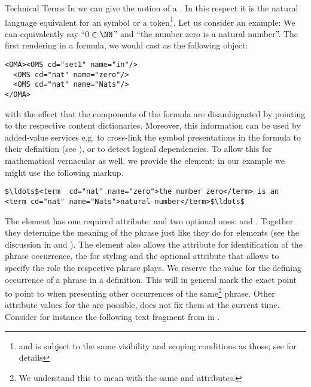 \begin{module}[id=mtext]
\begin{omgroup}[id=mtext,short=Mathematical Text]
\begin{omgroup}[id=terms]{Technical Terms}
  In {\omdoc} we can give the notion of a . In this respect it is the natural language equivalent for an
  {\openmath} symbol or a {\cmathml} token\footnote{and is subject to the same visibility
    and scoping conditions as those; see {} for details}. Let us
  consider an example: We can equivalently say ``$0\in\NN$'' and ``the number zero is a
  natural number''. The first rendering in a formula, we would cast as the following
  {\openmath} object:
\begin{lstlisting}[language=OpenMath,numbers=none]
<OMA><OMS cd="set1" name="in"/>
  <OMS cd="nat" name="zero"/>
  <OMS cd="nat" name="Nats"/>
</OMA>
\end{lstlisting}
with the effect that the components of the formula are disambiguated by pointing to the
respective content dictionaries. Moreover, this information can be used by added-value
services e.g. to cross-link the symbol presentations in the formula to their definition
(see {}), or to detect logical dependencies. To allow
this for mathematical vernacular as well, we provide the {} element: in our
example we might use the following markup.
\begin{lstlisting}[language=OpenMath,numbers=none,mathescape]
$\ldots$<term  cd="nat" name="zero">the number zero</term> is an 
<term cd="nat" name="Nats">natural number</term>$\ldots$
\end{lstlisting}
\begin{definition}[id=term.def]
  The {} element has one required attribute: {} and two
  optional ones: {} and {}.  Together they
  determine the meaning of the phrase just like they do for {}
  elements (see the discussion in {} and {}). The
  {} element also allows the attribute {}
  for identification of the phrase occurrence, the {\css}
   for styling and the optional
  {} attribute that allows to specify the role the respective phrase
  plays. We reserve the value {} for the defining occurrence
  of a phrase in a definition.  This will in general mark the exact point to point to when
  presenting other occurrences of the same\footnote{We understand this to mean with the
    same {} and {} attributes.} phrase. Other
  attribute values for the {} are possible, {\omdoc} does not fix
  them at the current time.  Consider for instance the following text fragment from
  {} in {}.
\end{definition}


\end{omgroup}
\end{omgroup}
\end{module}
